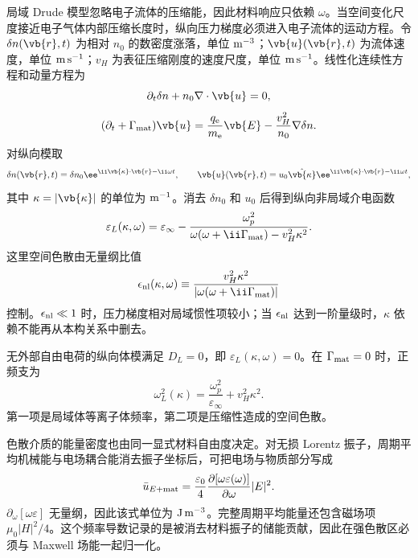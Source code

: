 局域 Drude 模型忽略电子流体的压缩能，因此材料响应只依赖 $\omega$。当空间变化尺度接近电子气体内部压缩长度时，纵向压力梯度必须进入电子流体的运动方程。令 $\delta n(\vb{r},t)$ 为相对 $n_0$ 的数密度涨落，单位 ${\rm m^{-3}}$；$\vb{u}(\vb{r},t)$ 为流体速度，单位 ${\rm m\,s^{-1}}$；$v_H$ 为表征压缩刚度的速度尺度，单位 ${\rm m\,s^{-1}}$。线性化连续性方程和动量方程为
\begin{equation*}
\partial_t\delta n+n_0\nabla\cdot\vb{u}=0,
\end{equation*}
\begin{equation*}
(\partial_t+\Gamma_{\rm mat})\vb{u}
=\frac{q_{\mathrm e}}{m_{\mathrm e}}\vb{E}
-\frac{v_H^2}{n_0}\nabla\delta n.
\end{equation*}
对纵向模取
\[
\delta n(\vb{r},t)=\delta n_0\ee^{\ii\vb{\kappa}\cdot\vb{r}-\ii\omega t},\qquad
\vb{u}(\vb{r},t)=u_0\hat{\vb{\kappa}}\ee^{\ii\vb{\kappa}\cdot\vb{r}-\ii\omega t},
\]
其中 $\kappa=|\vb{\kappa}|$ 的单位为 ${\rm m^{-1}}$。消去 $\delta n_0$ 和 $u_0$ 后得到纵向非局域介电函数
\begin{equation*}
\varepsilon_L(\kappa,\omega)
=\varepsilon_\infty
-\frac{\omega_p^2}
{\omega(\omega+\ii\Gamma_{\rm mat})-v_H^2\kappa^2}.
\end{equation*}
这里空间色散由无量纲比值
\begin{equation}
{
\epsilon_{\rm nl}(\kappa,\omega)
\equiv
\frac{v_H^2\kappa^2}
{|\omega(\omega+\ii\Gamma_{\rm mat})|}}
\label{eq:hydrodynamic_nonlocal_control}
\end{equation}
控制。$\epsilon_{\rm nl}\ll1$ 时，压力梯度相对局域惯性项较小；当 $\epsilon_{\rm nl}$ 达到一阶量级时，$\kappa$ 依赖不能再从本构关系中删去。

无外部自由电荷的纵向体模满足 $D_L=0$，即 $\varepsilon_L(\kappa,\omega)=0$。在 $\Gamma_{\rm mat}=0$ 时，正频支为
\begin{equation}
{
\omega_L^2(\kappa)
=\frac{\omega_p^2}{\varepsilon_\infty}
+v_H^2\kappa^2.}
\label{eq:hydrodynamic_bulk_longitudinal_dispersion}
\end{equation}
第一项是局域体等离子体频率，第二项是压缩性造成的空间色散。

色散介质的能量密度也由同一显式材料自由度决定。对无损 Lorentz 振子，周期平均机械能与电场耦合能消去振子坐标后，可把电场与物质部分写成
\begin{equation*}
\bar u_{E+{\rm mat}}
=\frac{\varepsilon_0}{4}
\frac{\partial[\omega\varepsilon(\omega)]}{\partial\omega}
|E|^2.
\end{equation*}
$\partial_\omega[\omega\varepsilon]$ 无量纲，因此该式单位为 ${\rm J\,m^{-3}}$。完整周期平均能量还包含磁场项 $\mu_0|H|^2/4$。这个频率导数记录的是被消去材料振子的储能贡献，因此在强色散区必须与 Maxwell 场能一起归一化。

